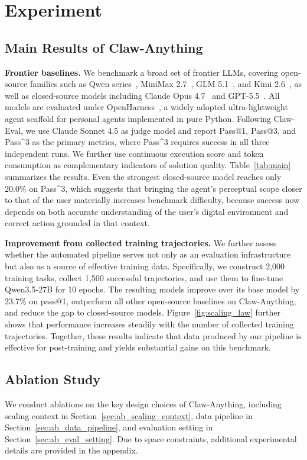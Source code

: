 \documentclass{article}
\begin{document}
\section{Experiment}
\label{sec:experiments}
\subsection{Main Results of Claw-Anything}
\textbf{Frontier baselines.} We benchmark a broad set of frontier LLMs, covering open-source families such as Qwen series~\citep{qwen3p5,qwen3p6-27b}, MiniMax 2.7~\citep{minimax_m27}, GLM 5.1~\citep{GLM51}, and Kimi 2.6~\citep{kimi26}, as well as closed-source models including Claude Opus 4.7~\citep{opus47} and GPT-5.5~\citep{openai_gpt55}. All models are evaluated under OpenHarness~\citep{openharness}, a widely adopted ultra-lightweight agent scaffold for personal agents implemented in pure Python. Following Claw-Eval, we use Claude Sonnet 4.5 as judge model and report Pass@1, Pass@3, and Pass\textasciicircum{}3 as the primary metrics, where Pass\textasciicircum{}3 requires success in all three independent runs. We further use continuous execution score and token consumption as complementary indicators of solution quality. Table~\ref{tab:main} summarizes the results. Even the strongest closed-source model reaches only 20.0\% on Pass\textasciicircum{}3, which suggests that bringing the agent's perceptual scope closer to that of the user materially increases benchmark difficulty, because success now depends on both accurate understanding of the user's digital environment and correct action grounded in that context.

\textbf{Improvement from collected training trajectories.} We further assess whether the automated pipeline serves not only as an evaluation infrastructure but also as a source of effective training data. Specifically, we construct 2,000 training tasks, collect 1,500 successful trajectories, and use them to fine-tune Qwen3.5-27B for 10 epochs. The resulting models improve over its base model by 23.7\% on pass@1, outperform all other open-source baselines on Claw-Anything, and reduce the gap to closed-source models. Figure~\ref{fig:scaling_law} further shows that performance increases steadily with the number of collected training trajectories. Together, these results indicate that data produced by our pipeline is effective for post-training and yields substantial gains on this benchmark.
\subsection{Ablation Study}
We conduct ablations on the key design choices of Claw-Anything, including scaling context in Section~\ref{sec:ab_scaling_context}, data pipeline in Section~\ref{sec:ab_data_pipeline}, and evaluation setting in Section~\ref{sec:ab_eval_setting}. Due to space constraints, additional experimental details are provided in the appendix.
\end{document}

